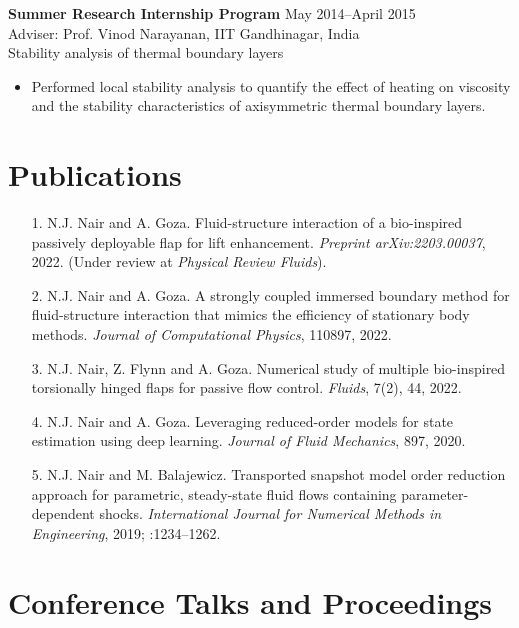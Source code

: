 \documentclass[margin]{res}
\begin{document}
\begin{resume}
{\bf Summer Research Internship Program} \hfill   May 2014--April 2015\\
Adviser: Prof. Vinod Narayanan, IIT Gandhinagar, India \\
Stability analysis of thermal boundary layers
\begin{itemize}
	\item Performed local stability analysis to quantify the effect of heating on viscosity and the stability characteristics of axisymmetric thermal boundary layers.%
\end{itemize}


\section{\large Publications}
 \begin{itemize}
 
  	\item[1.] N.J. Nair and A. Goza. Fluid-structure interaction of a bio-inspired passively deployable flap for lift enhancement. \textit{Preprint arXiv:2203.00037}, 2022. (Under review at \textit{Physical Review Fluids}).

	\item[2.] N.J. Nair and A. Goza. A strongly coupled immersed boundary method for fluid-structure interaction that mimics the efficiency of stationary body methods. \textit{Journal of Computational Physics},  110897, 2022.
	
	\item[3.] N.J. Nair, Z. Flynn and A. Goza. Numerical study of multiple bio-inspired torsionally hinged flaps for passive flow control. \textit{Fluids}, 7(2), 44, 2022.
	
	\item[4.] N.J. Nair and A. Goza. Leveraging reduced-order models for state estimation using deep learning. \textit{Journal of Fluid Mechanics}, 897, 2020.
	
	\item[5.] N.J. Nair and M. Balajewicz. Transported snapshot model order reduction approach for parametric, steady-state fluid flows containing parameter-dependent shocks. \textit{International Journal for Numerical Methods in Engineering}, 2019; :1234–1262.
	
 \end{itemize}
 
\section{\large Conference Talks and Proceedings}


\end{resume}
\end{document}
